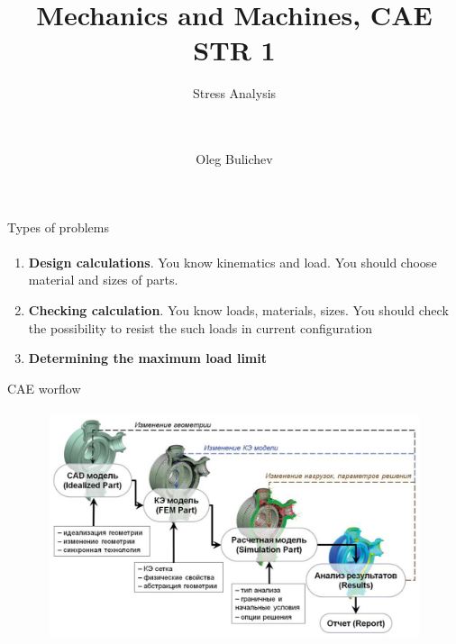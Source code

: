 \documentclass[aspectratio=169]{beamer}
\title[MaM]{Mechanics and Machines, CAE STR 1} %
\subtitle{Stress Analysis
\\ \  \\ \ 
    } %
\author{Oleg Bulichev}
\newcommand{\fbckg}[1]{\usebackgroundtemplate{\texttt{[image: \#1]}}}%
\begin{document}
\setlength{\abovedisplayskip}{0pt}
\setlength{\belowdisplayskip}{0pt}
\setlength{\abovedisplayshortskip}{0pt}
\setlength{\belowdisplayshortskip}{0pt}

\fbckg{fibeamer/figs/title_page.png}

\fbckg{fibeamer/figs/common.png}

\note{\scriptsize
\ 
}

\begin{frame}[t]{Types of problems}
\framesubtitle{}
    \begin{enumerate}
        \item \textbf{Design calculations}. You know kinematics and load. You should choose material and sizes of parts.
        \item \textbf{Checking calculation}. You know loads, materials, sizes. You should check the possibility to resist the such loads in current configuration
        \item \textbf{Determining the maximum load limit} 
    \end{enumerate}
\end{frame}

\begin{frame}[t]{CAE worflow}
\framesubtitle{}
    \vspace{-0.6cm}
    \begin{figure}[H]
        \centering\includegraphics[height=6.5cm,width=1\textwidth,keepaspectratio]{cae_workflow.png}
        \label{fig:cae_workflow.png}
    \end{figure}
\end{frame}
\end{document}
